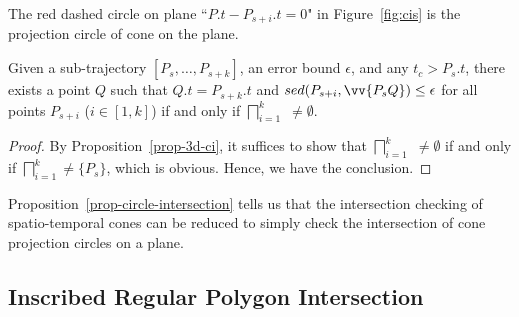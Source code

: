 The red dashed circle  on plane ``$P.t-P_{s+i}.t=0$" in Figure~\ref{fig:cis} is the projection circle of cone  on the plane.


\begin{prop}
\label{prop-circle-intersection}
Given a sub-trajectory $[P_s,\ldots, P_{s+k}]$, an error bound $\epsilon$, and any $t_c > P_s.t$, there exists a point $Q$ such that $Q.t = P_{s+k}.t$ and $sed(P_{s+i}, \vv{P_sQ})\le \epsilon$ for all points $P_{s+i}$ ($i \in [1,k]$) if and only if $\bigsqcap_{i=1}^{k}$ $\ne \emptyset$.
\end{prop}


\begin{proof}
By Proposition~\ref{prop-3d-ci}, it suffices to show that $\bigsqcap_{i=1}^{k}$  $\ne \emptyset$ if and only if $\bigsqcap_{i=1}^{k}$$\ne \{P_s\}$, which is obvious. Hence, we have the conclusion.
\end{proof}



Proposition~\ref{prop-circle-intersection} tells us that the intersection checking of  spatio-temporal cones can be reduced to simply check the intersection of cone projection circles on a plane.


\subsection{Inscribed Regular Polygon Intersection}
\label{subsec-RPI}

